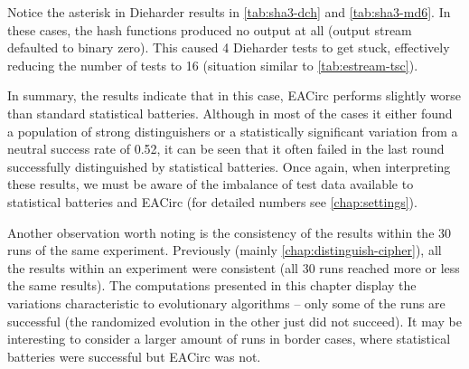 \documentclass[12pt,oneside]{fithesis2}
\begin{document}
Notice the asterisk in Dieharder results in \autoref{tab:sha3-dch} and \autoref{tab:sha3-md6}.
In these cases, the hash functions produced no output at all (output stream defaulted to binary zero).
This caused 4 Dieharder tests to get stuck, effectively reducing the number of tests to 16 
(situation similar to \autoref{tab:estream-tsc}).

In summary, the results indicate that in this case, EACirc performs slightly worse than standard statistical batteries.
Although in most of the cases it either found a population of strong distinguishers or a statistically significant variation
from a neutral success rate of 0.52, it can be seen that it often failed in the last round successfully distinguished
by statistical batteries. Once again, when interpreting these results, we must be aware of the imbalance of test data
available to statistical batteries and EACirc (for detailed numbers see \autoref{chap:settings}).

Another observation worth noting is the consistency of the results within the 30 runs of the same experiment.
Previously (mainly \autoref{chap:distinguish-cipher}), all the results within an experiment were consistent 
(all 30 runs reached more or less the same results).
The computations presented in this chapter display the variations characteristic to evolutionary algorithms -- 
only some of the runs are successful (the randomized evolution in the other just did not succeed).
It may be interesting to consider a larger amount of runs in border cases, where statistical batteries were successful
but EACirc was not.
\vfill
\end{document}
